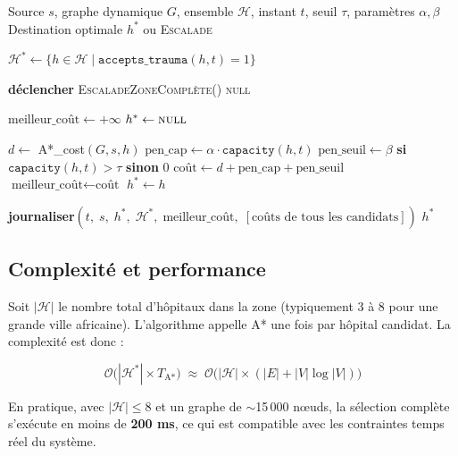 \documentclass[12pt,a4paper]{article}
\theoremstyle{definition}
\theoremstyle{remark}
\begin{document}
\begin{algorithm}[H]
\caption{Sélection du destinataire optimal (Twist 5)}
\begin{algorithmic}[1]
\Require Source $s$, graphe dynamique $G$, ensemble $\mathcal{H}$,
         instant $t$, seuil $\tau$, paramètres $\alpha, \beta$
\Ensure Destination optimale $h^*$ ou \textsc{Escalade}

\State $\mathcal{H}^* \gets \{h \in \mathcal{H} \mid
    \texttt{accepts\_trauma}(h,t) = 1\}$

  \State \textbf{déclencher} \textsc{EscaladeZoneComplète}() 
  \State \Return \textsc{null}
\EndIf

\State $\text{meilleur\_coût} \gets +\infty$
\State $h^* \gets \textsc{null}$

  \State $d \gets$ A*\_cost$(G, s, h)$ 
  \State $\text{pen\_cap} \gets \alpha \cdot \texttt{capacity}(h, t)$
  \State $\text{pen\_seuil} \gets \beta$ \textbf{ si }
         $\texttt{capacity}(h,t) > \tau$ \textbf{ sinon } $0$
  \State $\text{coût} \gets d + \text{pen\_cap} + \text{pen\_seuil}$
    \State $\text{meilleur\_coût} \gets \text{coût}$
    \State $h^* \gets h$
  \EndIf
\EndFor

\State \textbf{journaliser}$(t,\; s,\; h^*,\; \mathcal{H}^*,\;
  \text{meilleur\_coût},\; [\text{coûts de tous les candidats}])$
\State \Return $h^*$
\end{algorithmic}
\end{algorithm}

\subsection{Complexité et performance}

Soit $|\mathcal{H}|$ le nombre total d'hôpitaux dans la zone (typiquement
$3$ à $8$ pour une grande ville africaine). L'algorithme appelle A* une
fois par hôpital candidat. La complexité est donc :

\[
  \mathcal{O}\bigl(|\mathcal{H}^*| \times T_{\text{A*}}\bigr)
  \;\approx\;
  \mathcal{O}\bigl(|\mathcal{H}| \times (|E| + |V| \log |V|)\bigr)
\]

En pratique, avec $|\mathcal{H}| \leq 8$ et un graphe de $\sim$15\,000
nœuds, la sélection complète s'exécute en moins de \textbf{200 ms},
ce qui est compatible avec les contraintes temps réel du système.
\end{document}
